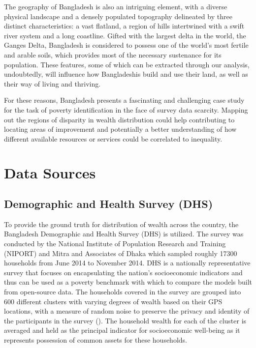 \documentclass[solid,math,chem,code,plot,gloss]{bmc}
\begin{document}
The geography of Bangladesh is also an intriguing element, with a diverse physical landscape and a densely populated topography delineated by three distinct characteristics: a vast flatland, a region of hills intertwined with a swift river system and a long coastline. Gifted with the largest delta in the world, the Ganges Delta, Bangladesh is considered to possess one of the world's most fertile and arable soils, which provides most of the necessary sustenance for its population. These features, some of which can be extracted through our analysis, undoubtedly, will influence how Bangladeshis build and use their land, as well as their way of living and thriving. 

For these reasons, Bangladesh presents a fascinating and challenging case study for the task of poverty identification in the face of survey data scarcity. Mapping out the regions of disparity in wealth distribution could help contributing to locating areas of improvement and potentially a better understanding of how different available resources or services could be correlated to inequality.

\chapter{Data Sources}

\section{Demographic and Health Survey (DHS)}

To provide the ground truth for distribution of wealth across the country, the Bangladesh Demographic and Health Survey (DHS) is utilized. The survey was conducted by the National Institute of Population Research and Training (NIPORT) and Mitra and Associates of Dhaka which sampled roughly 17300 households from June 2014 to November 2014. DHS is a nationally representative survey that focuses on encapsulating the nation's socioeconomic indicators and thus can be used as a poverty benchmark with which to compare the models built from open-source data. The households covered in the survey are grouped into 600 different clusters with varying degrees of wealth based on their GPS locations, with a measure of random noise to preserve the privacy and identity of the participants in the survey (\cite{dhs_2014}). The household wealth for each of the cluster is averaged and held as the principal indicator for socioeconomic well-being as it represents possession of common assets for these households. 
\end{document}
